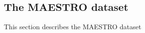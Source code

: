 \documentclass[../../sections/dataset.tex]{subfiles}
\begin{document}
\subsection{The MAESTRO dataset}

    This section describes the MAESTRO dataset
\end{document}
